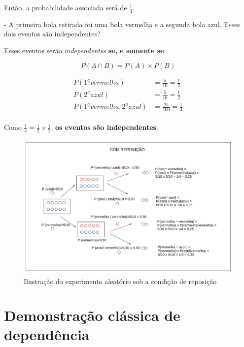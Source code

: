 \documentclass[
]{book}
\begin{document}
\hfill\break

Então, a probabilidade associada será de \(\frac{1}{4}\).

\hfill\break

- A primeira bola retirada foi uma bola vermelha e a segunda bola azul. Esses dois eventos são independentes?

\hfill\break

Esses eventos serão \emph{independentes} \textbf{se, e somente se}:

\hfill\break

\[
P (A \cap B)= P(A) \times P(B)
\]

\hfill\break

\begin{align*}
    P(1^{a} vermelha) & = \frac{5}{10}= \frac{1}{2}\\
    P(2^{a} azul) & = \frac{5}{10}= \frac{1}{2}\\
    P(1^{a} vermelha,2^{a} azul) & = \frac{25}{100} = \frac{1}{4}\\
\end{align*}

\hfill\break

Como \(\frac{1}{4}=\frac{1}{2} \times \frac{1}{2}\), \textbf{os eventos são independentes}.

\hfill\break

\begin{figure}

{\centering \includegraphics[width=0.5\linewidth]{images4/com_rep} 

}

\caption{Ilustração do experimento aleatório sob a condição de reposição}\label{fig:unnamed-chunk-73}
\end{figure}

\hypertarget{demonstrauxe7uxe3o-cluxe1ssica-de-dependuxeancia}{%
\section{Demonstração clássica de dependência}\label{demonstrauxe7uxe3o-cluxe1ssica-de-dependuxeancia}}
\end{document}
